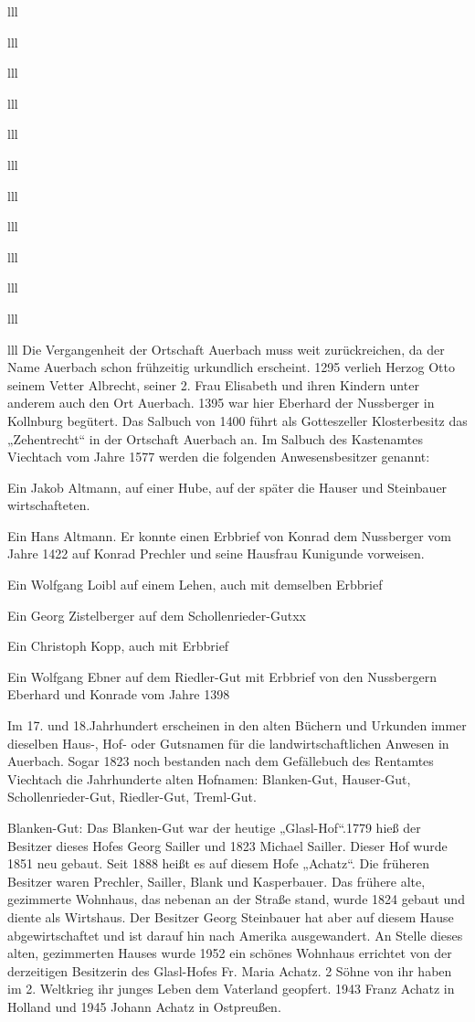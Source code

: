 \documentclass[12pt,a4pager]{book}
\begin{document}
\begin{tabuluar}{lll}
\begin{tabuluar}{lll}
\begin{tabuluar}{lll}
\begin{tabuluar}{lll}
\begin{tabuluar}{lll}
\begin{tabuluar}{lll}
\begin{tabuluar}{lll}
\begin{tabuluar}{lll}
\begin{tabuluar}{lll}
\begin{tabuluar}{lll}
\begin{tabuluar}{lll}
\begin{tabuluar}{lll}
Die Vergangenheit der Ortschaft Auerbach muss weit zurückreichen, da der Name
Auerbach schon frühzeitig urkundlich erscheint. 1295 verlieh Herzog Otto seinem
Vetter Albrecht, seiner 2. Frau Elisabeth und ihren Kindern unter anderem auch
den Ort Auerbach. 1395 war hier Eberhard der Nussberger in Kollnburg begütert.
Das Salbuch von 1400 führt als Gotteszeller Klosterbesitz das „Zehentrecht“ in
der Ortschaft Auerbach an. Im Salbuch des Kastenamtes Viechtach vom Jahre 1577
werden die folgenden Anwesensbesitzer genannt:

Ein Jakob Altmann, auf einer Hube, auf der später die Hauser und Steinbauer
wirtschafteten.

Ein Hans Altmann. Er konnte einen Erbbrief von Konrad dem Nussberger vom Jahre
1422 auf Konrad Prechler und seine Hausfrau Kunigunde vorweisen.

Ein Wolfgang Loibl auf einem Lehen, auch mit demselben Erbbrief

Ein Georg Zistelberger auf dem Schollenrieder-Gutxx

Ein Christoph Kopp, auch mit Erbbrief

Ein Wolfgang Ebner auf dem Riedler-Gut mit Erbbrief von den Nussbergern Eberhard
und Konrade vom Jahre 1398

Im 17. und 18.Jahrhundert erscheinen in den alten Büchern und Urkunden immer
dieselben Haus-, Hof- oder Gutsnamen für die landwirtschaftlichen Anwesen in
Auerbach. Sogar 1823 noch bestanden nach dem Gefällebuch des Rentamtes Viechtach
die Jahrhunderte alten Hofnamen: Blanken-Gut, Hauser-Gut, Schollenrieder-Gut,
Riedler-Gut, Treml-Gut.

Blanken-Gut: Das Blanken-Gut war der heutige „Glasl-Hof“.1779 hieß der Besitzer
dieses Hofes Georg Sailler und 1823 Michael Sailler. Dieser Hof wurde 1851 neu
gebaut. Seit 1888 heißt es auf diesem Hofe „Achatz“. Die früheren Besitzer waren
Prechler, Sailler, Blank und Kasperbauer. Das frühere alte, gezimmerte Wohnhaus,
das nebenan an der Straße stand, wurde 1824 gebaut und diente als Wirtshaus. Der
Besitzer Georg Steinbauer hat aber auf diesem Hause abgewirtschaftet und ist
darauf hin nach Amerika ausgewandert. An Stelle dieses alten, gezimmerten Hauses
wurde 1952 ein schönes Wohnhaus errichtet von der derzeitigen Besitzerin des
Glasl-Hofes Fr. Maria Achatz. 2 Söhne von ihr haben im 2. Weltkrieg ihr junges
Leben dem Vaterland geopfert. 1943 Franz Achatz in Holland und 1945 Johann
Achatz in Ostpreußen.


\end{tabuluar}
\end{tabuluar}
\end{tabuluar}
\end{tabuluar}
\end{tabuluar}
\end{tabuluar}
\end{tabuluar}
\end{tabuluar}
\end{tabuluar}
\end{tabuluar}
\end{tabuluar}
\end{tabuluar}
\end{document}

